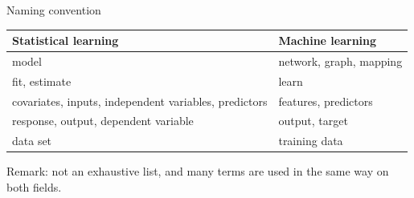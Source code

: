 \documentclass[ignorenonframetext,]{beamer}
\begin{document}
\begin{frame}

\begin{block}{Naming convention}

\begin{longtable}[]{@{}ll@{}}
\toprule
\begin{minipage}[b]{0.47\columnwidth}\raggedright\strut
Statistical learning\strut
\end{minipage} & \begin{minipage}[b]{0.47\columnwidth}\raggedright\strut
Machine learning\strut
\end{minipage}\tabularnewline
\midrule
\endhead
\begin{minipage}[t]{0.47\columnwidth}\raggedright\strut
model\strut
\end{minipage} & \begin{minipage}[t]{0.47\columnwidth}\raggedright\strut
network, graph, mapping\strut
\end{minipage}\tabularnewline
\begin{minipage}[t]{0.47\columnwidth}\raggedright\strut
fit, estimate\strut
\end{minipage} & \begin{minipage}[t]{0.47\columnwidth}\raggedright\strut
learn\strut
\end{minipage}\tabularnewline
\begin{minipage}[t]{0.47\columnwidth}\raggedright\strut
covariates, inputs, independent variables, predictors\strut
\end{minipage} & \begin{minipage}[t]{0.47\columnwidth}\raggedright\strut
features, predictors\strut
\end{minipage}\tabularnewline
\begin{minipage}[t]{0.47\columnwidth}\raggedright\strut
response, output, dependent variable\strut
\end{minipage} & \begin{minipage}[t]{0.47\columnwidth}\raggedright\strut
output, target\strut
\end{minipage}\tabularnewline
\begin{minipage}[t]{0.47\columnwidth}\raggedright\strut
data set\strut
\end{minipage} & \begin{minipage}[t]{0.47\columnwidth}\raggedright\strut
training data\strut
\end{minipage}\tabularnewline
\bottomrule
\end{longtable}

Remark: not an exhaustive list, and many terms are used in the same way
on both fields.

\end{block}

\end{frame}
\end{document}
